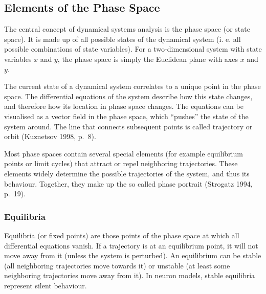 \documentclass[12pt,a4paper,]{report}
\begin{document}
\subsection{Elements of the Phase
Space}\label{elements-of-the-phase-space}

The central concept of dynamical systems analysis is the phase space (or
state space). It is made up of all possible states of the dynamical
system (i. e. all possible combinations of state variables). For a
two-dimensional system with state variables $x$ and $y$, the phase space
is simply the Euclidean plane with axes $x$ and $y$.

The current state of a dynamical system correlates to a unique point in
the phase space. The differential equations of the system describe how
this state changes, and therefore how its location in phase space
changes. The equations can be visualised as a vector field in the phase
space, which ``pushes'' the state of the system around. The line that
connects subsequent points is called trajectory or orbit (Kuznetsov
1998, p.~8).

Most phase spaces contain several special elements (for example
equilibrium points or limit cycles) that attract or repel neighboring
trajectories. These elements widely determine the possible trajectories
of the system, and thus its behaviour. Together, they make up the so
called phase portrait (Strogatz 1994, p.~19).

\subsubsection{Equilibria}\label{equilibria}

Equilibria (or fixed points) are those points of the phase space at
which all differential equations vanish. If a trajectory is at an
equilibrium point, it will not move away from it (unless the system is
perturbed). An equilibrium can be stable (all neighboring trajectories
move towards it) or unstable (at least some neighboring trajectories
move away from it). In neuron models, stable equilibria represent silent
behaviour.
\end{document}
